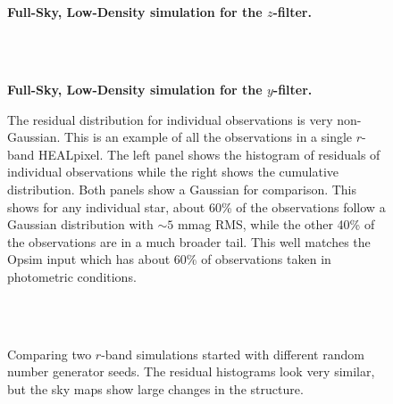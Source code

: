 \documentclass[12pt,preprint]{aastex}
\begin{document}
\begin{figure}
 \\
 \\
\caption{ {\bf Full-Sky, Low-Density simulation for the $z$-filter.}  \label{fig:z1e6}}
\end{figure}

\begin{figure}
 \\
 \\
\caption{ {\bf Full-Sky, Low-Density simulation for the $y$-filter.}  \label{fig:y1e6}}
\end{figure}


\begin{figure}
\caption{The residual distribution for individual observations is very non-Gaussian.  This is an example of all the observations in a single $r$-band HEALpixel.  The left panel shows the histogram of residuals of individual observations while the right shows the cumulative distribution.  Both panels show a Gaussian for comparison.  This shows for any individual star, about 60\% of the observations follow a Gaussian distribution with $\sim5$ mmag RMS, while the other 40\% of the observations are in a much broader tail.  This well matches the Opsim input which has about 60\% of observations taken in photometric conditions. \label{fig:resid_dist}}
\end{figure}


\begin{figure}
 \\
 \\
\caption{Comparing two $r$-band simulations started with different random number generator seeds.  The residual histograms look very similar, but the sky maps show large changes in the structure. \label{fig:diffseed} }
\end{figure}
\end{document}

